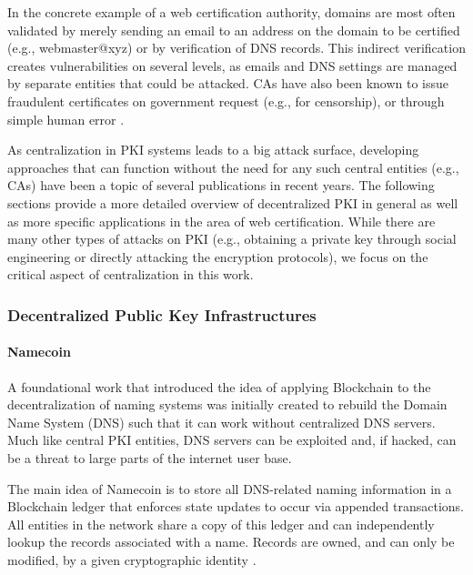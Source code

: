 In the concrete example of a web certification authority, domains are most often validated by merely sending an email to an address on the domain to be certified (e.g., webmaster@xyz) or by verification of DNS records. This indirect verification creates vulnerabilities on several levels, as emails and DNS settings are managed by separate entities that could be attacked. CAs have also been known to issue fraudulent certificates on government request (e.g., for censorship), or through simple human error \cite{zusman_criminal_2008, zohar_blockchain-based_2019}.

As centralization in PKI systems leads to a big attack surface, developing approaches that can function without the need for any such central entities (e.g., CAs) have been a topic of several publications in recent years. The following sections provide a more detailed overview of decentralized PKI in general as well as more specific applications in the area of web certification. While there are many other types of attacks on PKI (e.g., obtaining a private key through social engineering or directly attacking the encryption protocols), we focus on the critical aspect of centralization in this work.


\subsubsection{Decentralized Public Key Infrastructures}

\paragraph{Namecoin}

A foundational work that introduced the idea of applying Blockchain to the decentralization of naming systems was initially created to rebuild the Domain Name System (DNS) such that it can work without centralized DNS servers. Much like central PKI entities, DNS servers can be exploited and, if hacked, can be a threat to large parts of the internet user base.

The main idea of Namecoin is to store all DNS-related naming information in a Blockchain ledger that enforces state updates to occur via appended transactions. All entities in the network share a copy of this ledger and can independently lookup the records associated with a name. Records are owned, and can only be modified, by a given cryptographic identity \cite{noauthor_namecoin_nodate, ali_blockstack:_2016}.

